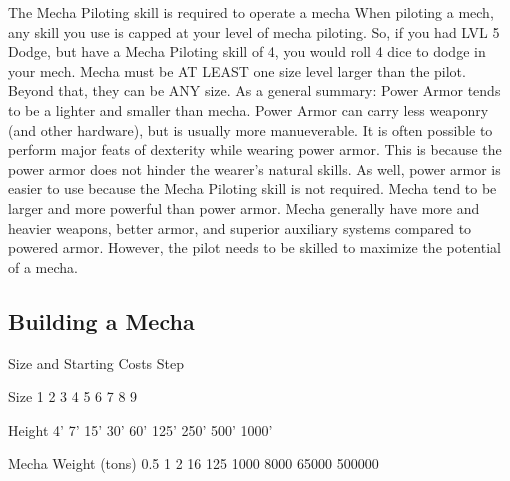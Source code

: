 \documentclass[twoside]{book}
\begin{document}
               The Mecha Piloting skill is required to operate a
               mecha 
               When piloting a mech, any skill you use is capped at
               your level of mecha piloting. So, if you had LVL 5 Dodge,
               but have a Mecha Piloting skill of 4, you would roll 4
               dice to dodge in your mech. 
               Mecha must be AT LEAST one size level larger than
               the pilot. Beyond that, they can be ANY size. 
            As a general summary: Power Armor tends to be a
             lighter and smaller than mecha. Power Armor can carry less
             weaponry (and other hardware), but is usually more
             manueverable. It is often possible to perform major feats of
             dexterity while wearing power armor. This is because the
             power armor does not hinder the wearer's natural
             skills. As well, power armor is easier to use because the
             Mecha Piloting skill is not required.   Mecha tend to be larger and more powerful than power
             armor. Mecha generally have more and heavier weapons, better
             armor, and superior auxiliary systems compared to powered
             armor. However, the pilot needs to be skilled to maximize
             the potential of a mecha. 
\subsection{Building a Mecha}
      
                
                Size and Starting Costs Step  
                  
                    
                      
                       Size   
                       1 
                       2 
                       3   
                       4 
                       5 
                       6   
                       7 
                       8 
                       9   
                      
                      
                       Height   
                       4'   
                       7'   
                       15'   
                       30'   
                       60'   
                       125'   
                       250'   
                       500'   
                       1000'   
                      
                      
                       Mecha Weight (tons)   
                       0.5   
                       1   
                       2   
                       16   
                       125   
                       1000   
                       8000   
                       65000   
                       500000   
                      
\end{document}
